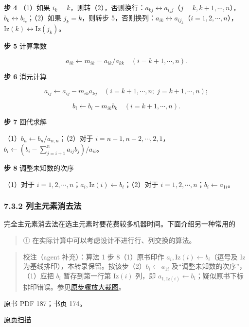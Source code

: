 \documentclass[
  10pt,
  fontset=fandol]{ctexart}
\begin{document}
\textbf{步 4} （1）如果 \(i_k=k\)，则转（2），否则换行：\(a_{kj}\leftrightarrow a_{i_kj}\)（\(j=k,k+1,\cdots,n\)），\(b_k\leftrightarrow b_{i_k}\)；（2）如果 \(j_k=k\)，则转步 5，否则换列：\(a_{ik}\leftrightarrow a_{ij_k}\)（\(i=1,2,\cdots,n\)），\(\mathrm{Iz}(k)\leftrightarrow\mathrm{Iz}(j_k)\)。

\textbf{步 5} 计算乘数

\[a_{ik}\leftarrow m_{ik}=a_{ik}/a_{kk}\quad(i=k+1,\cdots,n).\]

\textbf{步 6} 消元计算

\[a_{ij}\leftarrow a_{ij}-m_{ik}a_{kj}\quad(i=k+1,\cdots,n;\;j=k+1,\cdots,n);\]

\[b_i\leftarrow b_i-m_{ik}b_k\quad(i=k+1,\cdots,n).\]

\textbf{步 7} 回代求解

（1）\(b_n\leftarrow b_n/a_{n,n}\)；（2）对于 \(i=n-1,n-2,\cdots,2,1\)，\(b_i\leftarrow\left(b_i-\sum_{j=i+1}^{n}a_{ij}b_j\right)/a_{ii}\)。

\textbf{步 8} 调整未知数的次序

（1）对于 \(i=1,2,\cdots,n\)；\(a_i,\mathrm{Iz}(i)\leftarrow b_i\)；（2）对于 \(i=1,2,\cdots,n\)；\(b_i\leftarrow a_{1i}\)。

\subsubsection{7.3.2 列主元素消去法}\label{ux5217ux4e3bux5143ux7d20ux6d88ux53bbux6cd5}

完全主元素消去法在选主元素时要花费较多机器时间。下面介绍另一种常用的

\begin{quote}
① 在实际计算中可以考虑设计不进行行、列交换的算法。
\end{quote}

\begin{quote}
校注（agent 补充）：算法 1 步 8（1）原书印作 \(a_i,\mathrm{Iz}(i)\leftarrow b_i\)（逗号及 Iz 为基线排印），本转录保留。按该步（2）\(b_i\leftarrow a_{1i}\) 及``调整未知数的次序''，（1）应把 \(b_i\) 暂存到第一行第 \(\mathrm{Iz}(i)\) 列，即 \(a_{1,\mathrm{Iz}(i)}\leftarrow b_i\)；疑似原书下标排印错误。参见\href{/Users/xiangjunfeng/Desktop/数值计算专用/numerical-analysis/book/staging/ch07a/assets/pdf-186-step8-detail.png}{原步骤放大裁图}。
\end{quote}

\clearpage

原书 PDF 187；书页 174。

\href{/Users/xiangjunfeng/Desktop/数值计算专用/numerical-analysis/book/source-images/pdf-187.jpeg}{原页扫描}
\end{document}
